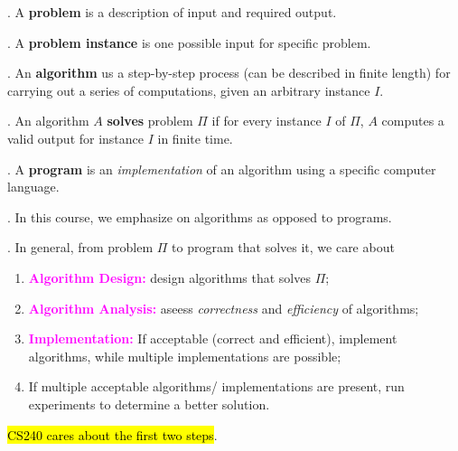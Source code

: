 \documentclass{article}
\begin{document}
\begin{deff}.
    A \textbf{problem} is a description of input and required output. 
\end{deff}

\begin{deff}.
    A \textbf{problem instance} is one possible input for specific problem. 
\end{deff}

\begin{deff}.
    An \textbf{algorithm} us a step-by-step process (can be described in finite length) for carrying out a series of computations, given an arbitrary instance $I$. 
\end{deff}

\begin{deff}.
    An algorithm $A$ \textbf{solves} problem $\Pi$ if for every instance $I$ of $\Pi$, $A$ computes a valid output for instance $I$ in finite time. 
\end{deff}

\begin{deff}.
    A \textbf{program} is an \textit{implementation} of an algorithm using a specific computer language. 
\end{deff}

\begin{discovery}[].
    In this course, we emphasize on algorithms as opposed to programs. 
\end{discovery}

\begin{thmm}[].
    In general, from problem $\Pi$ to program that solves it, we care about \begin{enumerate}
        \item \textcolor{magenta}{\textbf{Algorithm Design:}} design algorithms that solves $\Pi$; 
        \item \textcolor{magenta}{\textbf{Algorithm Analysis:}} aseess \textit{correctness} and \textit{efficiency} of algorithms; 
        \item \textcolor{magenta}{\textbf{Implementation:}} If acceptable (correct and efficient), implement algorithms, while multiple implementations are possible; 
        \item If multiple acceptable algorithms/ implementations are present, run experiments to determine a better solution. 
    \end{enumerate}
    \hl{CS240 cares about the first two steps}. 
\end{thmm}
\end{document}
